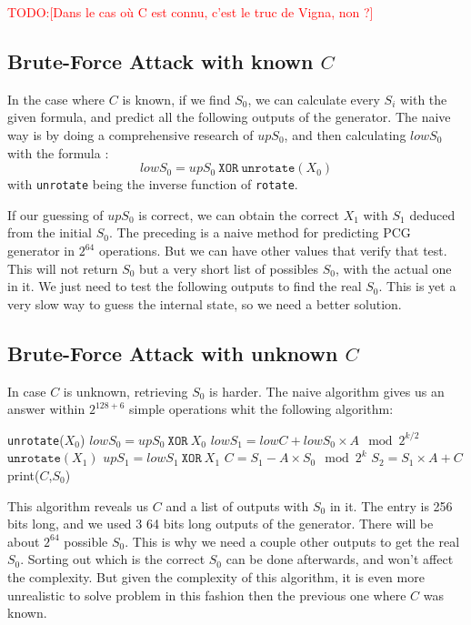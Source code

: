 \documentclass[preprint]{iacrtrans}
\newcommand{\todo}[1]{\textcolor{red}{TODO:[#1]}}
\begin{document}
\todo{Dans le cas où C est connu, c'est le truc de Vigna, non ?}

\subsection{Brute-Force Attack with known $C$}

In the case where $C$ is known, if we find $S_0$, we can calculate every $S_i$
with the given formula, and predict all the following outputs of the
generator. The naive way is by doing a comprehensive research of $upS_0$, and
then calculating $lowS_0$ with the formula :
\begin{equation}
    lowS_0 = upS_0\ \mathtt{XOR}\ \mathtt{unrotate}(X_0)
\end{equation}
with \texttt {unrotate} being the inverse function of \texttt{rotate}.


If our guessing of $upS_0$ is correct, we can obtain the correct $X_1$ with
$S_1$ deduced from the initial $S_0$. The preceding is a naive method for
predicting PCG generator in $2^{64}$ operations. But we can have other values
that verify that test. This will not return $S_0$ but a very short list of
possibles $S_0$, with the actual one in it. We just need to test the following
outputs to find the real $S_0$. This is yet a very slow way to guess the
internal state, so we need a better solution.

\subsection{Brute-Force Attack with unknown $C$}

In case $C$ is unknown, retrieving $S_0$ is harder. The naive algorithm gives us
an answer within $2^{128+6}$ simple operations whit the following algorithm:

\begin{algorithmic}[!h]
    \STATE \texttt{unrotate}($X_0$)
    \STATE $lowS_0 = upS_0\ \mathtt{XOR}\ X_0$
    \STATE $lowS_1 = lowC + lowS_0 \times A \mod{2^{k/2}}$
        \STATE $\mathtt{unrotate}(X_1)$
        \STATE $upS_1 = lowS_1\ \mathtt{XOR}\ X_1$
        \STATE $C = S_1 - A \times S_0 \mod{2^{k}}$
        \STATE $S_2 = S_1 \times A + C$
            \STATE print($C$,$S_0$)
        \ENDIF
    \ENDFOR
\ENDFOR
\end{algorithmic}

This algorithm reveals us $C$ and a list of outputs with $S_0$ in it. The entry
is 256 bits long, and we used 3 64 bits long outputs of the generator. There
will be about $2^{64}$ possible $S_0$. This is why we need a couple other
outputs to get the real $S_0$. Sorting out which is the correct $S_0$ can be
done afterwards, and won't affect the complexity. But given the complexity of
this algorithm, it is even more unrealistic to solve problem in this fashion
then the previous one where $C$ was known.
\end{document}
